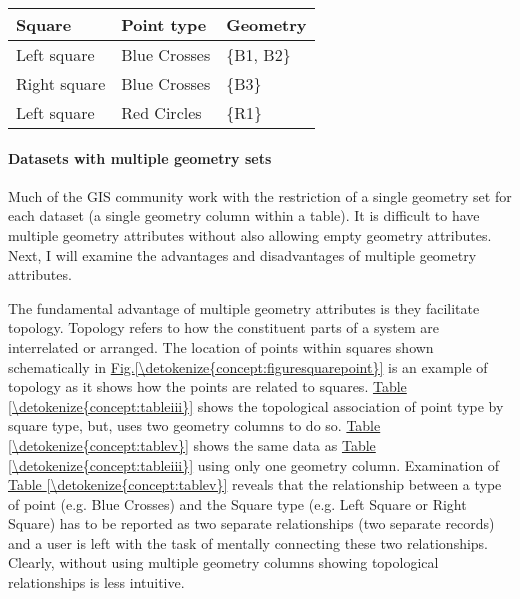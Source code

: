 \documentclass[letterpaper,11pt,english]{sphinxmanual}
\begin{document}
\begin{savenotes}\sphinxattablestart
\centering
{}
\label{\detokenize{concept:id52}}\label{\detokenize{concept:tableiiid}}
\sphinxaftercaption
\begin{tabulary}{\linewidth}[t]{|T|T|T|}
\hline
\sphinxstyletheadfamily 
Square
&\sphinxstyletheadfamily 
Point type
&\sphinxstyletheadfamily 
Geometry
\\
\hline
Left square
&
Blue Crosses
&
\{B1, B2\}
\\
\hline
Right square
&
Blue Crosses
&
\{B3\}
\\
\hline
Left square
&
Red Circles
&
\{R1\}
\\
\hline
\end{tabulary}
\par
\sphinxattableend\end{savenotes}


\paragraph{Datasets with multiple geometry sets}
\label{\detokenize{concept:datasets-with-multiple-geometry-sets}}
Much of the GIS community work with the restriction of a single geometry set for each dataset (a single geometry column within a table).  It is difficult to have multiple geometry attributes without also allowing empty geometry attributes.  Next, I will examine the advantages and disadvantages of multiple geometry attributes.

The fundamental advantage of multiple geometry attributes is they facilitate topology. Topology refers to how the constituent parts of a system are interrelated or arranged.  The location of points within squares shown schematically in \hyperref[\detokenize{concept:figuresquarepoint}]{Fig.\@ \ref{\detokenize{concept:figuresquarepoint}}} is an example of topology as it shows how the points are related to squares.  \hyperref[\detokenize{concept:tableiii}]{Table \ref{\detokenize{concept:tableiii}}} shows the topological association of point type by square type, but, uses two geometry columns to do so.  \hyperref[\detokenize{concept:tablev}]{Table \ref{\detokenize{concept:tablev}}} shows the same data as \hyperref[\detokenize{concept:tableiii}]{Table \ref{\detokenize{concept:tableiii}}} using only one geometry column.  Examination of \hyperref[\detokenize{concept:tablev}]{Table \ref{\detokenize{concept:tablev}}} reveals that the relationship between a type of point (e.g. Blue Crosses) and the Square type (e.g. Left Square or Right Square) has to be reported as two separate relationships (two separate records) and a user is left with the task of mentally connecting these two relationships.  Clearly, without using multiple geometry columns showing topological relationships is less intuitive.
\end{document}
